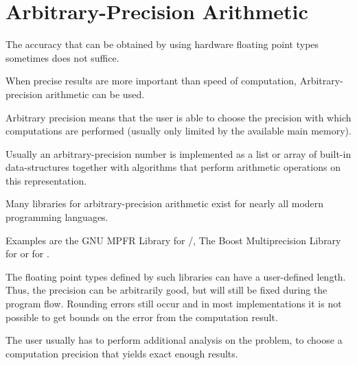 \section{Arbitrary-Precision Arithmetic}
	The accuracy that can be obtained by using hardware floating point types
  sometimes does not suffice.
	
	When precise results are more important than speed of computation, Arbitrary-precision arithmetic can be used.

	Arbitrary precision means that the user is able to choose the precision with which 
	computations are performed (usually only limited by the available main memory).

  Usually an arbitrary-precision number is implemented as a list or array of
  built-in data-structures together with algorithms that perform arithmetic operations on
  this representation.

	Many libraries for arbitrary-precision arithmetic exist for nearly all modern
  programming languages.
  
	Examples are the GNU MPFR Library for /\cc \cite{mpfr}, The Boost Multiprecision
Library for \cc \cite{boostmultiprecision} or  for 
\cite{mpmath}. 
  
  The floating point types defined by such libraries can have a user-defined
  length. 
  Thus, the precision can be arbitrarily good, but will still be fixed during
  the program flow.
  Rounding errors still occur and in most implementations it is not possible to
  get bounds on the error from the computation result.

  The user usually has to perform additional analysis on the problem, to choose
  a computation precision that yields exact enough results.
